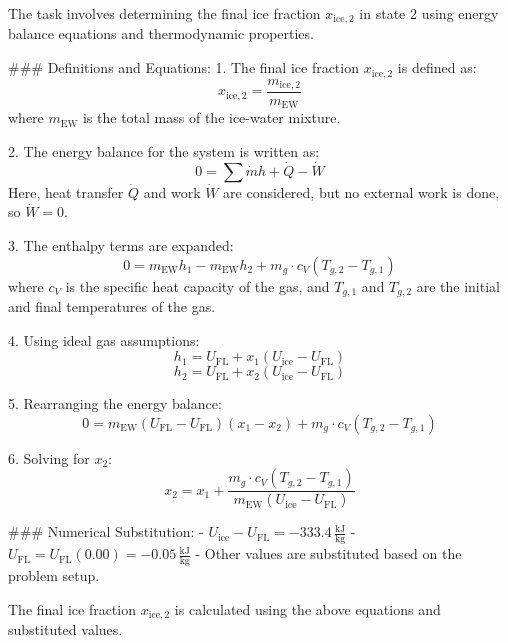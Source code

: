 The task involves determining the final ice fraction \( x_{\text{ice},2} \) in state 2 using energy balance equations and thermodynamic properties.

### Definitions and Equations:
1. The final ice fraction \( x_{\text{ice},2} \) is defined as:
   \[
   x_{\text{ice},2} = \frac{m_{\text{ice},2}}{m_{\text{EW}}}
   \]
   where \( m_{\text{EW}} \) is the total mass of the ice-water mixture.

2. The energy balance for the system is written as:
   \[
   0 = \sum \dot{m} h + \dot{Q} - \dot{W}
   \]
   Here, heat transfer \( \dot{Q} \) and work \( \dot{W} \) are considered, but no external work is done, so \( \dot{W} = 0 \).

3. The enthalpy terms are expanded:
   \[
   0 = m_{\text{EW}} h_1 - m_{\text{EW}} h_2 + m_g \cdot c_V (T_{g,2} - T_{g,1})
   \]
   where \( c_V \) is the specific heat capacity of the gas, and \( T_{g,1} \) and \( T_{g,2} \) are the initial and final temperatures of the gas.

4. Using ideal gas assumptions:
   \[
   h_1 = U_{\text{FL}} + x_1 (U_{\text{ice}} - U_{\text{FL}})
   \]
   \[
   h_2 = U_{\text{FL}} + x_2 (U_{\text{ice}} - U_{\text{FL}})
   \]

5. Rearranging the energy balance:
   \[
   0 = m_{\text{EW}} (U_{\text{FL}} - U_{\text{FL}}) (x_1 - x_2) + m_g \cdot c_V (T_{g,2} - T_{g,1})
   \]

6. Solving for \( x_2 \):
   \[
   x_2 = x_1 + \frac{m_g \cdot c_V (T_{g,2} - T_{g,1})}{m_{\text{EW}} (U_{\text{ice}} - U_{\text{FL}})}
   \]

### Numerical Substitution:
- \( U_{\text{ice}} - U_{\text{FL}} = -333.4 \, \frac{\text{kJ}}{\text{kg}} \)
- \( U_{\text{FL}} = U_{\text{FL}} (0.00) = -0.05 \, \frac{\text{kJ}}{\text{kg}} \)
- Other values are substituted based on the problem setup.

The final ice fraction \( x_{\text{ice},2} \) is calculated using the above equations and substituted values.